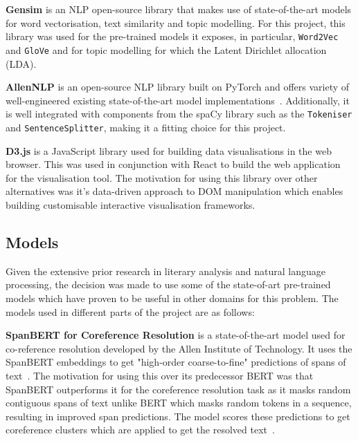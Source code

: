 \textbf{Gensim} is an NLP open-source library that makes use of state-of-the-art models for word vectorisation, text similarity and topic modelling. For this project, this library was used for the pre-trained models it exposes, in particular, \texttt{Word2Vec} and \texttt{GloVe} and for topic modelling for which the Latent Dirichlet allocation (LDA). 

\textbf{AllenNLP} is an open-source NLP library built on PyTorch and offers variety of well-engineered existing state-of-the-art model implementations~\cite{allennlp}. Additionally, it is well integrated with components from the spaCy library such as the \texttt{Tokeniser} and \texttt{SentenceSplitter}, making it a fitting choice for this project. 

\textbf{D3.js} is a JavaScript library used for building data visualisations in the web browser. This was used in conjunction with React to build the web application for the visualisation tool. The motivation for using this library over other alternatives was it's data-driven approach to DOM manipulation which enables building customisable interactive visualisation frameworks. 


\subsection{Models} \label{s:models}

Given the extensive prior research in literary analysis and natural language processing, the decision was made to use some of the state-of-art pre-trained models which have proven to be useful in other domains for this problem. The models used in different parts of the project are as follows: 

\textbf{SpanBERT for Coreference Resolution} is a state-of-the-art model used for co-reference resolution developed by the Allen Institute of Technology. It uses the SpanBERT embeddings to get "high-order coarse-to-fine" predictions of spans of text~\cite{spanBERT}. The motivation for using this over its predecessor BERT was that SpanBERT outperforms it for the coreference resolution task as it masks random contiguous spans of text unlike BERT which masks random tokens in a sequence, resulting in improved span predictions. The model scores these predictions to get coreference clusters which are applied to get the resolved text~\cite{spanBERT}.

